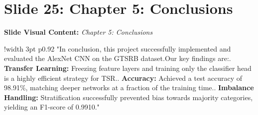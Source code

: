 \documentclass[11pt]{article}
\begin{document}
\section{Slide 25: Chapter 5: Conclusions}
\textbf{Slide Visual Content:} \textit{Chapter 5: Conclusions}\\ [8pt]
\noindent
\begin{tabular}{!{\color{primary}\vrule width 3pt} p{0.92\textwidth}}
  \small\color{black!80} "In conclusion, this project successfully implemented and evaluated the AlexNet CNN on the GTSRB dataset.\newline\newline Our key findings are:\newline{}.  \textbf{Transfer Learning:} Freezing feature layers and training only the classifier head is a highly efficient strategy for TSR.\newline{}.  \textbf{Accuracy:} Achieved a test accuracy of 98.91\%, matching deeper networks at a fraction of the training time.\newline{}.  \textbf{Imbalance Handling:} Stratification successfully prevented bias towards majority categories, yielding an F1-score of 0.9910."
\end{tabular}
\vspace{15pt}
\end{document}
